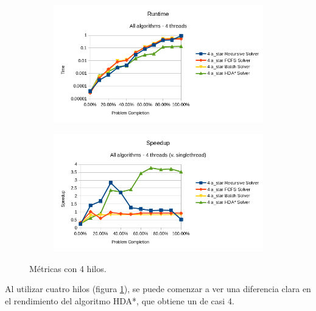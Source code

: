 \begin{figure}[h]
    \begin{subfigure}{.5\textwidth}
        \begin{center}
            \includegraphics[width=\textwidth]{Media/Ch2/Runtime_All_Algorithms_4.png}
        \end{center}
    \end{subfigure}
    \begin{subfigure}{.5\textwidth}
        \begin{center}
            \includegraphics[width=\textwidth]{Media/Ch2/Speedup_All_Algorithms_4.png}
        \end{center}
    \end{subfigure}
    \caption{Métricas con 4 hilos.}
    \label{fig:Metricas4Thread}
\end{figure}

Al utilizar cuatro hilos (figura \ref{fig:Metricas4Thread}), se puede comenzar a ver una diferencia clara
en el rendimiento del algoritmo HDA*, que obtiene un 
de casi 4.

